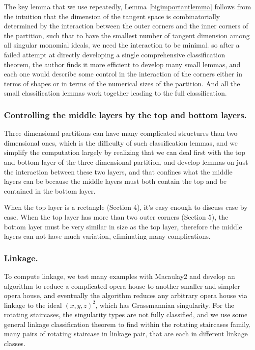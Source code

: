 \documentclass{amsart}[10pt]
\theoremstyle{plain}
\theoremstyle{definition}
\begin{document}
The key lemma that we use repeatedly, Lemma \ref{bigimportantlemma} follows from the intuition that the dimension of the tangent space is combinatorially determined by the interaction between the outer corners and the inner corners of the partition, such that to have the smallest number of tangent dimension among all singular monomial ideals, we need the interaction to be minimal. so after a failed attempt at directly developing a single comprehensive classification theorem, the author finds it more efficient to develop many small lemmas, and each one would describe some control in the interaction of the corners either in terms of shapes or in terms of the numerical sizes of the partition. And all the small classification lemmas work together leading to the full classification.

\subsubsection{Controlling the middle layers by the top and bottom layers.} Three dimensional partitions can have many complicated structures than two dimensional ones, which is the difficulty of such classification lemmas, and we simplify the computation largely by realizing that we can deal first with the top and bottom layer of the three dimensional partition, and develop lemmas on just the interaction between these two layers, and that confines what the middle layers can be because the middle layers must both contain the top and be contained in the bottom layer. 

When the top layer is a rectangle (Section 4), it's easy enough to discuss case by case. When the top layer has more than two outer corners (Section 5), the bottom layer must be very similar in size as the top layer, therefore the middle layers can not have much variation, eliminating many complications. 

\subsubsection{Linkage.} To compute linkage, we test many examples with Macaulay2 and develop an algorithm to reduce a complicated opera house to another smaller and simpler opera house, and eventually the algorithm reduces any arbitrary opera house via linkage to the ideal $(x,y,z)^2$, which has Grassmannian singularity. For the rotating staircases, the singularity types are not fully classified, and we use some general linkage classification theorem to find within the rotating staircases family, many pairs of rotating staircase in linkage pair, that are each in different linkage classes.
\end{document}
